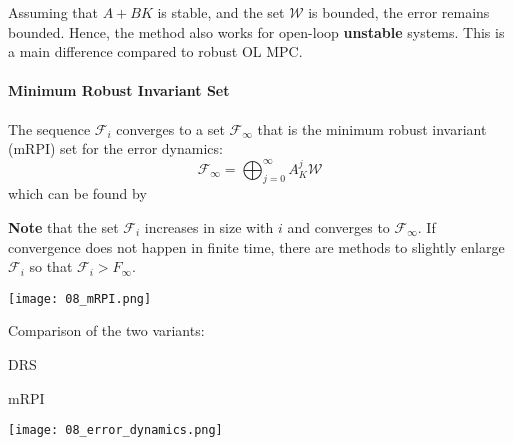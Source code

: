 Assuming that $A+BK$ is stable, and the set $\mathcal{W}$ is bounded, the error remains bounded. Hence, the method also works for open-loop \textbf{unstable} systems. This is a main difference compared to robust OL MPC.

\paragraph{Minimum Robust Invariant Set}

The sequence $\mathcal{F}_i$ converges to a set $\mathcal{F}_\infty$ that is the minimum robust invariant (mRPI) set for the error dynamics:
\begin{equation*}
    \mathcal{F}_\infty = \bigoplus_{j=0}^{\infty}A_{K}^{j}\mathcal{W}
\end{equation*}
which can be found by
\noindent{}

\textbf{Note} that the set $\mathcal{F}_i$ increases in size with $i$ and converges to $\mathcal{F}_\infty$. If convergence does not happen in finite time, there are methods to slightly enlarge $\mathcal{F}_i$ so that $\mathcal{F}_i>F_\infty$.

\begin{center}
    \texttt{[image: 08\_mRPI.png]}
\end{center}

Comparison of the two variants:

\begin{minipage}[t]{0.49\linewidth}
    \centering
    DRS
\end{minipage}
\begin{minipage}[t]{0.49\linewidth}
    \centering
    mRPI
\end{minipage}
\begin{center}
    \texttt{[image: 08\_error\_dynamics.png]}
\end{center}

